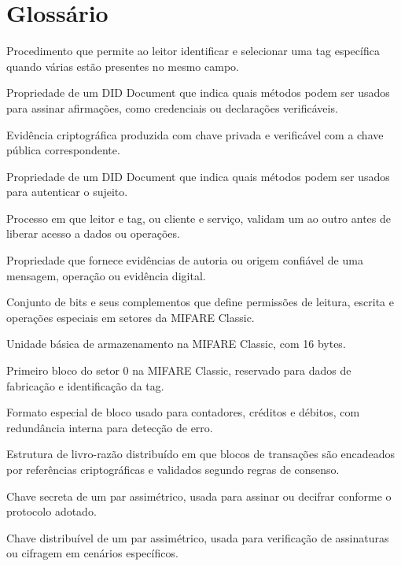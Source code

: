 \chapter*{Glossário}

\begin{description}[
  font=\normalfont\bfseries,
  style=multiline,
  leftmargin=5.8cm,
  labelwidth=5.1cm,
  labelsep=0.35cm,
  itemsep=0.55\baselineskip
]
  \item[Anticolisão] Procedimento que permite ao leitor identificar e selecionar uma tag específica quando várias estão presentes no mesmo campo.
  \item[Assertion Method] Propriedade de um DID Document que indica quais métodos podem ser usados para assinar afirmações, como credenciais ou declarações verificáveis.
  \item[Assinatura digital] Evidência criptográfica produzida com chave privada e verificável com a chave pública correspondente.
  \item[Authentication] Propriedade de um DID Document que indica quais métodos podem ser usados para autenticar o sujeito.
  \item[Autenticação mútua] Processo em que leitor e tag, ou cliente e serviço, validam um ao outro antes de liberar acesso a dados ou operações.
  \item[Autenticidade] Propriedade que fornece evidências de autoria ou origem confiável de uma mensagem, operação ou evidência digital.
  \item[Bits de acesso] Conjunto de bits e seus complementos que define permissões de leitura, escrita e operações especiais em setores da MIFARE Classic.
  \item[Bloco] Unidade básica de armazenamento na MIFARE Classic, com 16 bytes.
  \item[Bloco de fabricante] Primeiro bloco do setor 0 na MIFARE Classic, reservado para dados de fabricação e identificação da tag.
  \item[Bloco de valor] Formato especial de bloco usado para contadores, créditos e débitos, com redundância interna para detecção de erro.
  \item[Blockchain] Estrutura de livro-razão distribuído em que blocos de transações são encadeados por referências criptográficas e validados segundo regras de consenso.
  \item[Chave privada] Chave secreta de um par assimétrico, usada para assinar ou decifrar conforme o protocolo adotado.
  \item[Chave pública] Chave distribuível de um par assimétrico, usada para verificação de assinaturas ou cifragem em cenários específicos.

\end{description}
